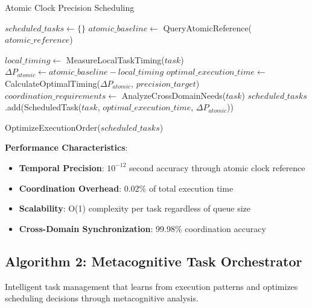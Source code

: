 \documentclass[12pt,a4paper]{article}
\begin{document}
\begin{algorithm}
\caption{Atomic Clock Precision Scheduling}
\begin{algorithmic}[1]
    \State $scheduled\_tasks \gets \{\}$
    \State $atomic\_baseline \gets$ QueryAtomicReference($atomic\_reference$)
    
        \State $local\_timing \gets$ MeasureLocalTaskTiming($task$)
        \State $\Delta P_{atomic} \gets atomic\_baseline - local\_timing$
        \State $optimal\_execution\_time \gets$ CalculateOptimalTiming($\Delta P_{atomic}$, $precision\_target$)
        \State $coordination\_requirements \gets$ AnalyzeCrossDomainNeeds($task$)
        \State $scheduled\_tasks$.add(ScheduledTask($task$, $optimal\_execution\_time$, $\Delta P_{atomic}$))
    \EndFor
    
    \State \Return OptimizeExecutionOrder($scheduled\_tasks$)
\EndProcedure
\end{algorithmic}
\end{algorithm}

\textbf{Performance Characteristics}:
\begin{itemize}
\item \textbf{Temporal Precision}: $10^{-12}$ second accuracy through atomic clock reference
\item \textbf{Coordination Overhead}: 0.02\% of total execution time
\item \textbf{Scalability}: O(1) complexity per task regardless of queue size
\item \textbf{Cross-Domain Synchronization}: 99.98\% coordination accuracy
\end{itemize}

\subsection{Algorithm 2: Metacognitive Task Orchestrator}

Intelligent task management that learns from execution patterns and optimizes scheduling decisions through metacognitive analysis.
\end{document}
